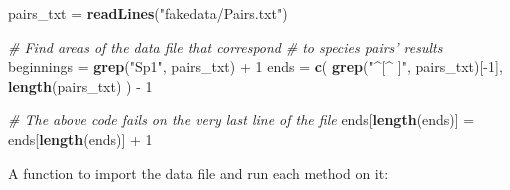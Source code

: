 \documentclass[11pt,]{article}
\newenvironment{Shaded}{\begin{snugshade}}{\end{snugshade}}
\newcommand{\KeywordTok}[1]{\textcolor[rgb]{0.13,0.29,0.53}{\textbf{{#1}}}}
\newcommand{\DecValTok}[1]{\textcolor[rgb]{0.00,0.00,0.81}{{#1}}}
\newcommand{\StringTok}[1]{\textcolor[rgb]{0.31,0.60,0.02}{{#1}}}
\newcommand{\CommentTok}[1]{\textcolor[rgb]{0.56,0.35,0.01}{\textit{{#1}}}}
\newcommand{\NormalTok}[1]{{#1}}
\begin{document}
\begin{Shaded}
\begin{Highlighting}[]
\NormalTok{pairs_txt =}\StringTok{ }\KeywordTok{readLines}\NormalTok{(}\StringTok{"fakedata/Pairs.txt"}\NormalTok{)}

\CommentTok{# Find areas of the data file that correspond}
\CommentTok{# to species pairs' results}
\NormalTok{beginnings =}\StringTok{ }\KeywordTok{grep}\NormalTok{(}\StringTok{"Sp1"}\NormalTok{, pairs_txt) +}\StringTok{ }\DecValTok{1}
\NormalTok{ends =}\StringTok{ }\KeywordTok{c}\NormalTok{(}
  \KeywordTok{grep}\NormalTok{(}\StringTok{"^[^ ]"}\NormalTok{, pairs_txt)[-}\DecValTok{1}\NormalTok{],}
  \KeywordTok{length}\NormalTok{(pairs_txt)}
\NormalTok{) -}\StringTok{ }\DecValTok{1}

\CommentTok{# The above code fails on the very last line of the file}
\NormalTok{ends[}\KeywordTok{length}\NormalTok{(ends)] =}\StringTok{ }\NormalTok{ends[}\KeywordTok{length}\NormalTok{(ends)] +}\StringTok{ }\DecValTok{1}
\end{Highlighting}
\end{Shaded}

A function to import the data file and run each method on it:
\end{document}
